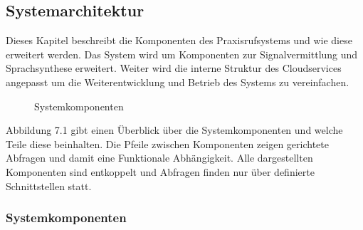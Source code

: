
\subsection{Systemarchitektur}

Dieses Kapitel beschreibt die Komponenten des Praxisrufsystems und wie diese erweitert werden.
Das System wird um Komponenten zur Signalvermittlung und Sprachsynthese erweitert.
Weiter wird die interne Struktur des Cloudservices angepasst um die Weiterentwicklung und Betrieb des Systems zu vereinfachen.

\begin{figure}[h]
    \centering
    \begin{minipage}[b]{0.8\textwidth}
        \caption{Systemkomponenten}
    \end{minipage}
\end{figure}

Abbildung 7.1 gibt einen Überblick über die Systemkomponenten und welche Teile diese beinhalten.
Die Pfeile zwischen Komponenten zeigen gerichtete Abfragen und damit eine Funktionale Abhängigkeit.
Alle dargestellten Komponenten sind entkoppelt und Abfragen finden nur über definierte Schnittstellen statt.

\subsubsection{Systemkomponenten}


